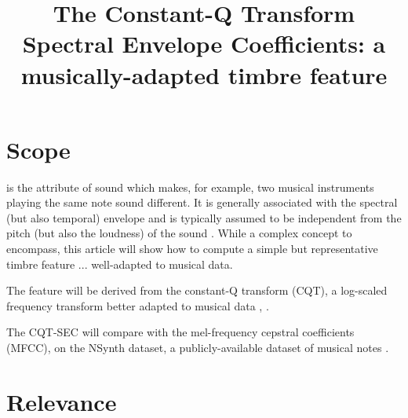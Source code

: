 \documentclass[journal]{IEEEtran}
\begin{document}
\title{The Constant-Q Transform Spectral Envelope Coefficients: a musically-adapted timbre feature}

\maketitle


\section{Scope}



 is the attribute of sound which makes, for example, two musical instruments playing the same note sound different. It is generally associated with the spectral (but also temporal) envelope and is typically assumed to be independent from the pitch (but also the loudness) of the sound \cite{moore2004}. While a complex concept to encompass, this article will show how to compute a simple but representative timbre feature ... well-adapted to musical data. 

The feature will be derived from the constant-Q transform (CQT), a log-scaled frequency transform better adapted to musical data \cite{brown1991}, \cite{brown1992}.

The CQT-SEC will compare with the mel-frequency cepstral coefficients (MFCC), on the NSynth dataset, a publicly-available dataset of musical notes \cite{engel2017}.


\section{Relevance}

\end{document}

